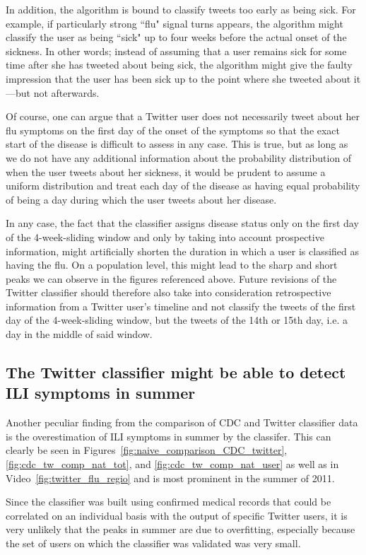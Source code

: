 \documentclass[11pt, a4paper,twoside]{report}\usepackage[]{graphicx}\usepackage[]{color}
\begin{document}
In addition, the algorithm is bound to classify tweets too early as being sick. For example, if particularly strong ``flu" signal turns appears, the algorithm might classify the user as being ``sick" up to four weeks before the actual onset of the sickness. In other words; instead of assuming that a user remains sick for some time after she has tweeted about being sick, the algorithm might give the faulty impression that the user has been sick up to the point where she tweeted about it---but not afterwards.

Of course, one can argue that a Twitter user does not necessarily tweet about her flu symptoms on the first day of the onset of the symptoms so that the exact start of the disease is difficult to assess in any case. This is true, but as long as we do not have any additional information about the probability distribution of when the user tweets about her sickness, it would be prudent to assume a uniform distribution and treat each day of the disease as having equal probability of being a day during which the user tweets about her disease. 

In any case, the fact that the classifier assigns disease status only on the first day of the 4-week-sliding window and only by taking into account prospective information, might artificially shorten the duration in which a user is classified as having the flu. On a population level, this might lead to the sharp and short peaks we can observe in the figures referenced above. Future revisions of the Twitter classifier should therefore also take into consideration retrospective information from a Twitter user's timeline and not classify the tweets of the first day of the 4-week-sliding window, but the tweets of the 14th or 15th day, i.e. a day in the middle of said window.

\subsection{The Twitter classifier might be able to detect ILI symptoms in summer}
Another peculiar finding from the comparison of CDC and Twitter classifier data is the overestimation of ILI symptoms in summer by the classifer. This can clearly be seen in Figures~\ref{fig:naive_comparison_CDC_twitter}, \ref{fig:cdc_tw_comp_nat_tot}, and \ref{fig:cdc_tw_comp_nat_user} as well as in Video~\ref{fig:twitter_flu_regio} and is most prominent in the summer of 2011. 

Since the classifier was built using confirmed medical records that could be correlated on an individual basis with the output of specific Twitter users, it is very unlikely that the peaks in summer are due to overfitting, especially because the set of users on which the classifier was validated was very small. 
\end{document}

